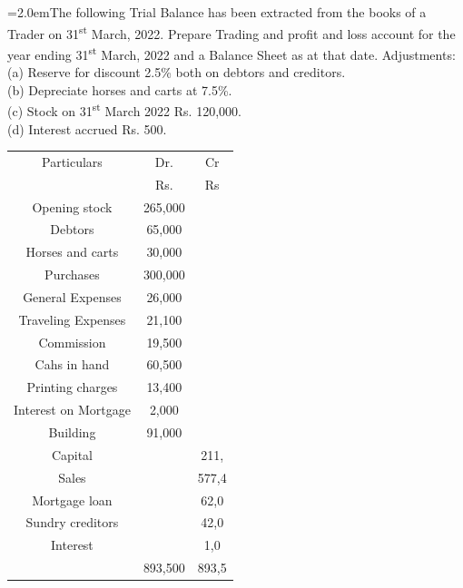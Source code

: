 \documentclass[11pt,a4paper]{article}
\newcommand{\lqn}[2]{\Needspace{6\baselineskip}\par\medskip\noindent\hangindent=2.0em\hangafter=1\makebox[2.0em][l]{\textbf{#1.}}#2\par}
\begin{document}
\lqn{104}{The following Trial Balance has been extracted from the books of a Trader on 31\textsuperscript{st} March, 2022. Prepare Trading and profit and loss account for the year ending 31\textsuperscript{st} March, 2022 and a Balance Sheet as at that date. Adjustments:\\
(a) Reserve for discount 2.5\% both on debtors and creditors.\\
(b) Depreciate horses and carts at 7.5\%.\\
(c) Stock on 31\textsuperscript{st}  March 2022 Rs. 120,000.\\
(d) Interest accrued Rs. 500.\par
\par\smallskip\noindent\hspace*{1.2em}\begin{tabular}{|ccc|}
\hline
Particulars & Dr. & Cr \\
 & Rs. & Rs \\
Opening stock & 265,000 &  \\
Debtors & 65,000 &  \\
Horses and carts & 30,000 &  \\
Purchases & 300,000 &  \\
General Expenses & 26,000 &  \\
Traveling Expenses & 21,100 &  \\
Commission & 19,500 &  \\
Cahs in hand & 60,500 &  \\
Printing charges & 13,400 &  \\
Interest on Mortgage & 2,000 &  \\
Building & 91,000 &  \\
Capital &  & 211, \\
Sales &  & 577,4 \\
Mortgage loan &  & 62,0 \\
Sundry creditors &  & 42,0 \\
Interest &  & 1,0 \\
 & 893,500 & 893,5 \\
\hline
\end{tabular}\par\smallskip
}
\end{document}
